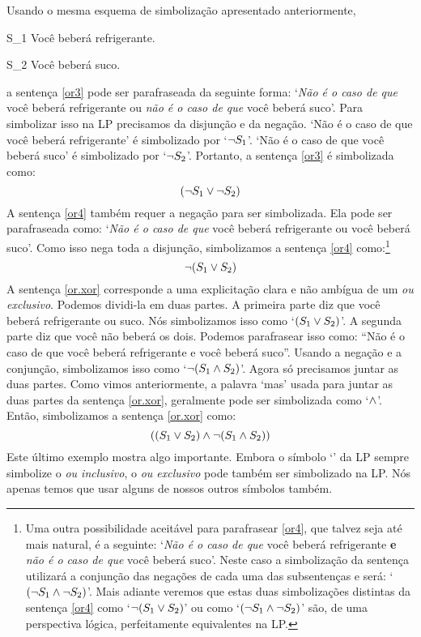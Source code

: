 Usando o mesma esquema de simbolização apresentado anteriormente,
	\begin{ekey}
		\item[S_1] Você beberá refrigerante.
		\item[S_2] Você beberá suco.
	\end{ekey}
a sentença \ref{or3} pode ser parafraseada da seguinte forma:
`\emph{Não é o caso de que} você beberá refrigerante ou \emph{não é o caso de que} você beberá suco'.
Para simbolizar isso na LP precisamos da disjunção e da negação.
`Não é o caso de que você beberá refrigerante' é simbolizado por `$\neg S_1$'. `Não é o caso de que você beberá suco' é simbolizado por `$\neg S_2$'. Portanto, a sentença \ref{or3} é simbolizada como:
$$(\neg S_1 \vee \neg S_2)$$
A sentença \ref{or4} também requer a negação para ser simbolizada.
Ela pode ser parafraseada como:
`\emph{Não é o caso de que} você beberá refrigerante ou você beberá suco'.
Como isso nega toda a disjunção, simbolizamos a sentença \ref{or4} como:\footnote{
	Uma outra possibilidade aceitável para parafrasear \ref{or4}, que talvez seja até mais natural, é a seguinte:
	`\emph{Não é o caso de que} você beberá refrigerante \textbf{e} \emph{não é o caso de que} você beberá suco'. Neste caso a simbolização da sentença utilizará a conjunção das negações de cada uma das subsentenças e será: `$(\neg S_1 \wedge \neg S_2)$'.
	Mais adiante veremos que estas duas simbolizações distintas da sentença \ref{or4} como `$\neg(S_1 \vee S_2)$' ou como `$(\neg S_1 \wedge \neg S_2)$' são, de uma perspectiva lógica, perfeitamente equivalentes na LP.}
$$\neg(S_1 \vee S_2)$$
A sentença \ref{or.xor} corresponde a uma explicitação clara e não ambígua de um \emph{ou exclusivo}. 
Podemos dividi-la em duas partes.
A primeira parte diz que você beberá refrigerante ou suco.
Nós simbolizamos isso como `$(S_1 \vee S_2)$'.
A segunda parte diz que você não beberá os dois.
Podemos parafrasear isso como:
``Não é o caso de que você beberá refrigerante e você beberá suco''.
Usando a negação e a conjunção, simbolizamos isso como `$\neg(S_1 \wedge S_2)$'.
Agora só precisamos juntar as duas partes.
Como vimos anteriormente, a palavra `mas' usada para juntar as duas partes da sentença \ref{or.xor}, geralmente pode ser simbolizada como `$\wedge$'.
Então, simbolizamos a sentença \ref{or.xor} como:
$$((S_1 \vee S_2) \wedge \neg (S_1 \wedge S_2))$$
Este último exemplo mostra algo importante.
Embora o símbolo `\eor' da LP sempre simbolize o \emph{ou inclusivo}, o \emph{ou exclusivo} pode também ser simbolizado na LP.
Nós apenas temos que usar alguns de nossos outros símbolos também.




